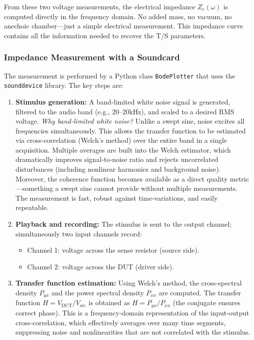 From these two voltage measurements, the electrical impedance $Z_e(\omega)$ is computed directly in the frequency domain. No added mass, no vacuum, no anechoic chamber—just a simple electrical measurement. This impedance curve contains all the information needed to recover the T/S parameters.

\subsubsection{Impedance Measurement with a Soundcard}

The measurement is performed by a Python class \texttt{BodePlotter} that uses the \texttt{sounddevice} library. The key steps are:

\begin{enumerate}
  \item \textbf{Stimulus generation:} A band‑limited white noise signal is generated, filtered to the audio band (e.g., $20$–$20$kHz), and scaled to a desired RMS voltage. \textit{Why band‑limited white noise?} Unlike a swept sine, noise excites all frequencies simultaneously. This allows the transfer function to be estimated via cross‑correlation (Welch’s method) over the entire band in a single acquisition. Multiple averages are built into the Welch estimator, which dramatically improves signal‑to‑noise ratio and rejects uncorrelated disturbances (including nonlinear harmonics and background noise). Moreover, the coherence function becomes available as a direct quality metric—something a swept sine cannot provide without multiple measurements. The measurement is fast, robust against time‑variations, and easily repeatable.
  \item \textbf{Playback and recording:} The stimulus is sent to the output channel; simultaneously two input channels record:
        \begin{itemize}
          \item Channel 1: voltage across the sense resistor (source side).
          \item Channel 2: voltage across the DUT (driver side).
        \end{itemize}
  \item \textbf{Transfer function estimation:} Using Welch’s method, the cross‑spectral density $P_{yx}$ and the power spectral density $P_{xx}$ are computed. The transfer function $H = V_{\text{DUT}} / V_{\text{src}}$ is obtained as $H = \overline{P_{yx}} / P_{xx}$ (the conjugate ensures correct phase). This is a frequency‑domain representation of the input‑output cross‑correlation, which effectively averages over many time segments, suppressing noise and nonlinearities that are not correlated with the stimulus.

\end{enumerate}
